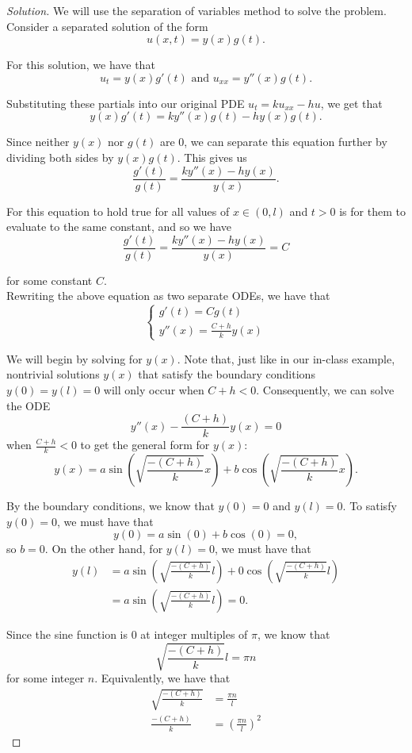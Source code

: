 \documentclass[11pt]{article}
\newenvironment{solution}
  {\renewcommand\qedsymbol{$\blacksquare$}\begin{proof}[Solution]}
  {\end{proof}}
\begin{document}
\begin{solution}
  We will use the separation of variables method to solve the problem. Consider a separated solution of the form \[u(x, t) = y(x) g(t).\]
  
  For this solution, we have that \[ u_t = y(x)g'(t) \text{ and } u_{xx} = y''(x) g(t).\]
  
  Substituting these partials into our original PDE $u_t = ku_{xx} - hu$, we get that
  \[ y(x)g'(t) = ky''(x)g(t) - hy(x)g(t).\]
  
  Since neither $y(x)$ nor $g(t)$ are $0$, we can separate this equation further by dividing both sides by $y(x)g(t)$. This gives us
  \[ \frac{g'(t)}{g(t)} = \frac{ky''(x) -hy(x)}{y(x)}.\]
  
  For this equation to hold true for all values of $x \in (0, l)$ and $t>0$ is for them to evaluate to the same constant, and so we have
  \[ \frac{g'(t)}{g(t)} = \frac{ky''(x) -hy(x)}{y(x)} = C\]
  
  for some constant $C$. \\
  
  Rewriting the above equation as two separate ODEs, we have that
  \[
  \begin{cases}
    g'(t) = Cg(t) \\
    y''(x) = \frac{C+h}{k}y(x)
  \end{cases}
  \]
  
  We will begin by solving for $y(x).$ Note that, just like in our in-class example, nontrivial solutions $y(x)$ that satisfy the boundary conditions $y(0)=y(l) = 0$ will only occur when $C+h < 0$. Consequently, we can solve the ODE 
  \[ y''(x) - \frac{(C+h)}{k}y(x) = 0\] when $\frac{C+h}{k} < 0$ to get the general form for $y(x)$: 
  \[ y(x) = a\sin\left(\sqrt{\frac{-(C+h)}{k}}x\right) + b\cos\left(\sqrt{\frac{-(C+h)}{k}}x\right).\]
  
  By the boundary conditions, we know that $y(0) = 0$ and $y(l) = 0.$ To satisfy $y(0) = 0$, we must have that
  \[ y(0) = a\sin(0) + b\cos(0) = 0, \]
  so $b = 0$. On the other hand, for $y(l) = 0$, we must have that
  \begin{align*}y(l)&= a\sin\left(\sqrt{\frac{-(C+h)}{k}}l\right) + 0\cos\left(\sqrt{\frac{-(C+h)}{k}}l\right) \\
  &= a\sin\left(\sqrt{\frac{-(C+h)}{k}}l\right) = 0.
  \end{align*}
  
  Since the sine function is $0$ at integer multiples of $\pi$, we know that \[\sqrt{\frac{-(C+h)}{k}}l = \pi n \] for some integer $n$. Equivalently, we have that 
  \begin{align*}\sqrt{\frac{-(C+h)}{k}} &= \frac{\pi n}{l} \\
  \frac{-(C+h)}{k} &= \left( \frac{\pi n}{l} \right)^2 \end{align*}
  

\end{solution}
\end{document}
